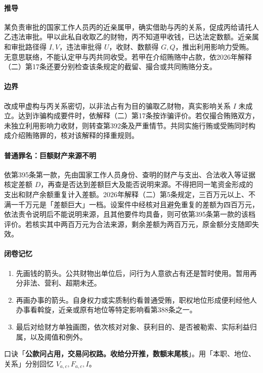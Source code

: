 \paragraph{推导}
某负责审批的国家工作人员丙的近亲属甲，确实借助与丙的关系，促成丙给请托人乙违法审批。甲以此私自收取乙的财物，丙不知道甲收钱，已达法定数额。近亲属和审批路径得 \(I,V\)，违法审批得 \(U\)，收财、数额得 \(G,Q\)，推出利用影响力受贿。无意思联络，不能认定甲与丙共同收受。若甲在介绍贿赂中占款，依2026年解释（二）第17条还要分别检查该条规定的截留、撮合或共同贿赂分支。

\paragraph{边界}
改成甲虚构与丙关系密切，以非法占有为目的骗取乙财物，真实影响关系 \(I\) 未成立。达到诈骗构成要件时，依解释（二）第17条按诈骗评价。若仅撮合贿赂双方，未独立利用影响力收财，则转查第392条及严重情节。共同实施行贿或受贿同时构成介绍贿赂罪的，核对该解释的择重规则。

\paragraph{普通罪名：巨额财产来源不明}
依第395条第一款，先由国家工作人员身份、查明的财产与支出、合法收入等证据核定差额 \(D\)，再查是否达到差额巨大及能否说明来源。不得把同一笔资金形成的支出和财产余额重复计入差额。2026年解释（二）第5条规定，三百万元以上、不满一千万元是「差额巨大」一档。设案件中经核对且避免重复的差额为四百万元，依法责令说明后不能说明来源，且其他要件均具备，则可依第395条第一款的该档评价。若核实其中两百万元为合法来源，剩余差额为两百万元，原金额分支随即失效。

\paragraph{闭卷记忆}
\begin{enumerate}
\item 先画钱的箭头。公共财物出单位后，问行为人意欲占有还是暂时使用。暂用再分非法、营利、超期未还。
\item 再画办事的箭头。自身权力或实质制约看普通受贿，职权地位形成便利经他人办事看斡旋，近亲或原有地位等特定影响看第388条之一。
\item 最后对给财方单独画图，依次核对对象、获利目的、是否被勒索、实际利益归属，以及阈值和例外。
\end{enumerate}
口诀「\textbf{公款问占用，交易问权路。收给分开推，数额末尾核}」。用「本职、地位、关系」分别回忆 \(V_{a,c},F_{a,c},I\)。

